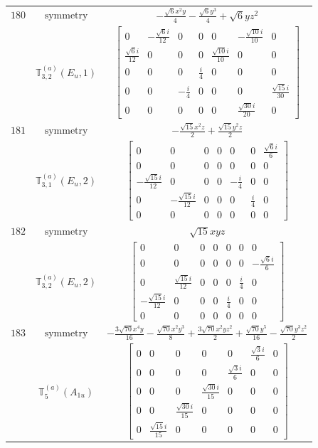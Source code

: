 \documentclass[fleqn,8pt,landscape]{jsarticle}
\begin{document}
\begin{longtable}{ccc}
$ 180 $ & $ \text{symmetry} $ & $ - \frac{\sqrt{6} x^{2} y}{4} - \frac{\sqrt{6} y^{3}}{4} + \sqrt{6} y z^{2} $ \\
$  $ & $ \mathbb{T}_{3,2}^{(a)}(E_{u},1) $ & $ \begin{bmatrix} 0 & - \frac{\sqrt{6} i}{12} & 0 & 0 & 0 & - \frac{\sqrt{10} i}{10} & 0 \\ \frac{\sqrt{6} i}{12} & 0 & 0 & 0 & \frac{\sqrt{10} i}{10} & 0 & 0 \\ 0 & 0 & 0 & \frac{i}{4} & 0 & 0 & 0 \\ 0 & 0 & - \frac{i}{4} & 0 & 0 & 0 & \frac{\sqrt{15} i}{30} \\ 0 & 0 & 0 & 0 & 0 & \frac{\sqrt{30} i}{20} & 0 \end{bmatrix} $ \\ \hline
$ 181 $ & $ \text{symmetry} $ & $ - \frac{\sqrt{15} x^{2} z}{2} + \frac{\sqrt{15} y^{2} z}{2} $ \\
$  $ & $ \mathbb{T}_{3,1}^{(a)}(E_{u},2) $ & $ \begin{bmatrix} 0 & 0 & 0 & 0 & 0 & 0 & \frac{\sqrt{6} i}{6} \\ 0 & 0 & 0 & 0 & 0 & 0 & 0 \\ - \frac{\sqrt{15} i}{12} & 0 & 0 & 0 & - \frac{i}{4} & 0 & 0 \\ 0 & - \frac{\sqrt{15} i}{12} & 0 & 0 & 0 & \frac{i}{4} & 0 \\ 0 & 0 & 0 & 0 & 0 & 0 & 0 \end{bmatrix} $ \\ \hline
$ 182 $ & $ \text{symmetry} $ & $ \sqrt{15} x y z $ \\
$  $ & $ \mathbb{T}_{3,2}^{(a)}(E_{u},2) $ & $ \begin{bmatrix} 0 & 0 & 0 & 0 & 0 & 0 & 0 \\ 0 & 0 & 0 & 0 & 0 & 0 & - \frac{\sqrt{6} i}{6} \\ 0 & \frac{\sqrt{15} i}{12} & 0 & 0 & 0 & \frac{i}{4} & 0 \\ - \frac{\sqrt{15} i}{12} & 0 & 0 & 0 & \frac{i}{4} & 0 & 0 \\ 0 & 0 & 0 & 0 & 0 & 0 & 0 \end{bmatrix} $ \\ \hline
$ 183 $ & $ \text{symmetry} $ & $ - \frac{3 \sqrt{70} x^{4} y}{16} - \frac{\sqrt{70} x^{2} y^{3}}{8} + \frac{3 \sqrt{70} x^{2} y z^{2}}{2} + \frac{\sqrt{70} y^{5}}{16} - \frac{\sqrt{70} y^{3} z^{2}}{2} $ \\
$  $ & $ \mathbb{T}_{5}^{(a)}(A_{1u}) $ & $ \begin{bmatrix} 0 & 0 & 0 & 0 & 0 & \frac{\sqrt{3} i}{6} & 0 \\ 0 & 0 & 0 & 0 & \frac{\sqrt{3} i}{6} & 0 & 0 \\ 0 & 0 & 0 & \frac{\sqrt{30} i}{15} & 0 & 0 & 0 \\ 0 & 0 & \frac{\sqrt{30} i}{15} & 0 & 0 & 0 & 0 \\ 0 & \frac{\sqrt{15} i}{15} & 0 & 0 & 0 & 0 & 0 \end{bmatrix} $ \\ \hline

\end{longtable}
\end{document}

